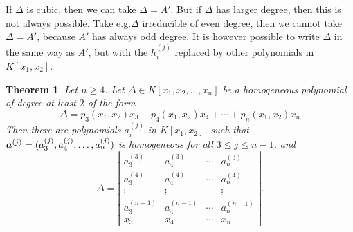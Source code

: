 \documentclass[12pt]{article}
\newtheorem{theorem}{Theorem}[section]
\theoremstyle{definition}
\theoremstyle{remark}
\def\bolda{\mbox{\boldmath $a$}}
\begin{document}
If $\Delta$ is cubic, then we can take $\Delta = A'$. But if $\Delta$ has larger degree,
then this is not always possible. Take e.g.\@ $\Delta$ irreducible of even degree, then 
we cannot take $\Delta = A'$, because $A'$ has always odd degree.
It is however possible to write $\Delta$ in the same way as $A'$, but with 
the $h^{(j)}_i$ replaced by other polynomials in $K[x_1,x_2]$.

\begin{theorem} \label{Delta_syzygy_determinant}
Let $n \geq 4$. 
Let $\Delta \in K[x_1,x_2,\ldots,x_n]$ be a homogeneous polynomial of 
degree at least $2$ of the form
$$
\Delta = p_3(x_1,x_2) x_3 + p_4(x_1,x_2) x_4 + \cdots + p_n(x_1,x_2) x_n
$$
Then there are polynomials $a^{(j)}_i$ in $K[x_1,x_2]$, 
such that $\bolda^{(j)} = (a^{(j)}_3,a^{(j)}_4,\ldots,a^{(j)}_n)$ 
is homogeneous for all $3 \le j \le n - 1$, and
$$
\Delta = \left| \begin{array}{cccc}
a^{(3)}_3 & a^{(3)}_4 & \cdots & a^{(3)}_n \\
a^{(4)}_3 & a^{(4)}_4 & \cdots & a^{(4)}_n \\
\vdots & \vdots & & \vdots \\
a^{(n-1)}_3 & a^{(n-1)}_4 & \cdots & a^{(n-1)}_n \\
\hline
x_3 & x_4 & \cdots & x_n
\end{array} \right|. 
$$ 
\end{theorem}
\end{document}
